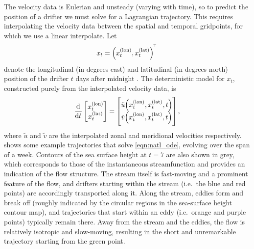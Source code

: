The velocity data is Eulerian and unsteady (varying with time), so to predict the position of a drifter we must solve for a Lagrangian trajectory.
This requires interpolating the velocity data between the spatial and temporal gridpoints, for which we use a linear interpolate.
Let
\[
	x_t = \left(x_t^{(\mathrm{lon})}, x_t^{(\mathrm{lat})}\right)^{^{\!\top}}
\]
denote the longitudinal (in degrees east) and latitudinal (in degrees north) position of the drifter \(t\) days after midnight .
The deterministic model for \(x_t\), constructed purely from the interpolated velocity data, is
\begin{equation}\label{eqn:natl_ode}
	\dod{}{t}\begin{bmatrix}
		x_t^{(\text{lon})} \\ x_t^{(\text{lat})}
	\end{bmatrix} = \begin{bmatrix}
		\tilde{u}\!\left(x^{(\mathrm{lon})}_t, x^{(\mathrm{lat})}_t, t\right) \\ \tilde{v}\!\left(x^{(\mathrm{lon})}_t, x^{(\mathrm{lat})}_t, t\right)
	\end{bmatrix},
\end{equation}
where \(\tilde{u}\) and \(\tilde{v}\) are the interpolated zonal and meridional velocities respectively.
 shows some example trajectories that solve \cref{eqn:natl_ode}, evolving over the span of a week.
Contours of the sea surface height at \(t = 7\) are also shown in grey, which corresponds to those of the instantaneous streamfunction and provides an indication of the flow structure.
The stream itself is fast-moving and a prominent feature of the flow, and drifters starting within the stream (i.e.\ the blue and red points) are accordingly transported along it.
Along the stream, eddies form and break off (roughly indicated by the circular regions in the sea-surface height contour map), and trajectories that start within an eddy (i.e.\ orange and purple points) typically remain there.
Away from the stream and the eddies, the flow is relatively isotropic and slow-moving, resulting in the short and unremarkable trajectory starting from the green point.

